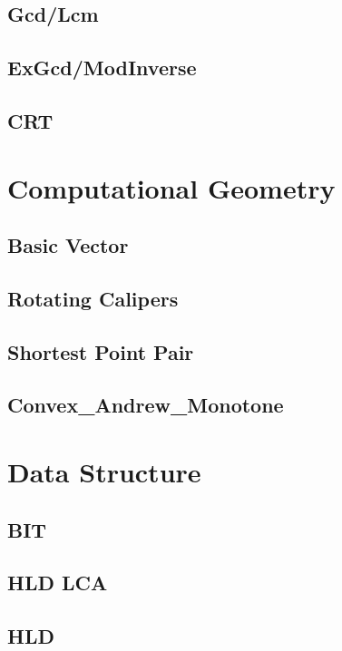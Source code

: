 	\subsection{Gcd/Lcm}
		
	\subsection{ExGcd/ModInverse}
		
	\subsection{CRT}
		
\section{Computational Geometry}
	\subsection{Basic Vector}
		
	\subsection{Rotating Calipers}
		
	\subsection{Shortest Point Pair}
		
	\subsection{Convex\_Andrew\_Monotone}
		
\section{Data Structure}
	\subsection{BIT}
		
	\subsection{HLD LCA}
		
	\subsection{HLD}
		
